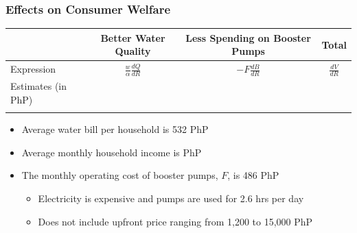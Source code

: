\documentclass[aspectratio=32]{beamer}
\begin{document}
\begin{frame}
\frametitle{Effects on Consumer Welfare}

\begin{table}[h!] 
\centering
\vspace{-2mm}
\begin{threeparttable}
\begin{tabular}{@{}l*{1}{CCC}@{}}
\toprule
            & Better Water Quality              &  Less Spending on Booster Pumps & Total             \\
\midrule
Expression  & $\frac{w}{\alpha} \frac{dQ}{dR}$ &   $- F \frac{dB}{dR}$  & $\frac{dV}{dR}$ \\[1em]
Estimates (in PhP)   &   \\
            &    \\
\bottomrule
\end{tabular}
\begin{tablenotes}
\footnotesize
\item 
\end{tablenotes}
\end{threeparttable}

\begin{itemize}
  \item Average water bill per household is 532 PhP
  \vspace{.5mm}
  \item Average monthly household income is PhP
    \vspace{.5mm}
  \item The monthly operating cost of booster pumps, $F$, is 486 PhP
    \vspace{.5mm}
  \begin{itemize}
    \item Electricity is expensive and pumps are used for 2.6 hrs per day
    \item Does not include upfront price ranging from 1,200 to 15,000 PhP
  \end{itemize}
\end{itemize}

\end{table}

\end{frame}
\end{document}
